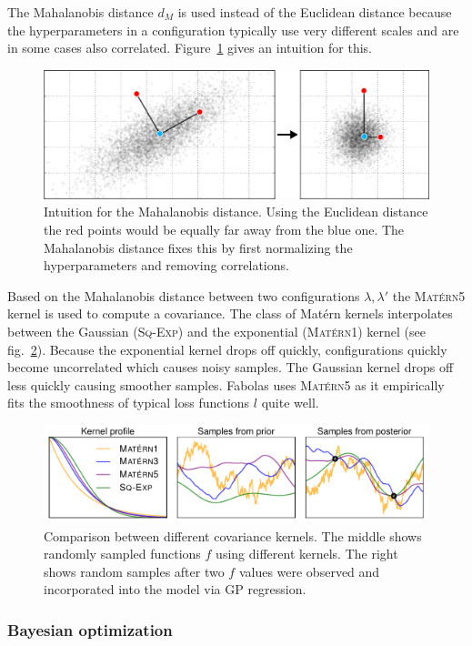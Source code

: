 The Mahalanobis distance \(d_M\) is used instead of the Euclidean distance because the hyperparameters in a configuration typically use very different scales and are in some cases also correlated.
Figure~\ref{fig:fabolas:mahalanobis} gives an intuition for this.
\begin{figure}
	\centering
	\includegraphics[width=0.7\linewidth]{gfx/fabolas/mahalanobisDistance.pdf}
	\caption{
		Intuition for the Mahalanobis distance.
		Using the Euclidean distance the red points would be equally far away from the blue one.
		The Mahalanobis distance fixes this by first normalizing the hyperparameters and removing correlations.
	}\label{fig:fabolas:mahalanobis}
\end{figure}

Based on the Mahalanobis distance between two configurations \(\lambda, \lambda'\) the \textsc{Matérn5} kernel is used to compute a covariance.
The class of Matérn kernels interpolates between the Gaussian (\textsc{Sq-Exp}) and the exponential (\textsc{Matérn1}) kernel (see fig.~\ref{fig:fabolas:matern}).
Because the exponential kernel drops off quickly, configurations quickly become uncorrelated which causes noisy samples.
The Gaussian kernel drops off less quickly causing smoother samples.
Fabolas uses \textsc{Matérn5} as it empirically fits the smoothness of typical loss functions \(l\) quite well.
\begin{figure}
	\centering
	\includegraphics[width=0.75\linewidth]{gfx/fabolas/matern.pdf}
	\caption{
		Comparison between different covariance kernels.
		The middle shows randomly sampled functions \(f\) using different kernels.
		The right shows random samples after two \(f\) values were observed and incorporated into the model via GP regression.
	}\label{fig:fabolas:matern}
\end{figure}

\subsubsection{Bayesian optimization}%
\label{sec:hyperparams:fabolas:bayesian}

